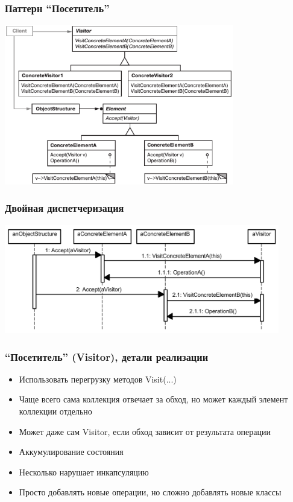 \documentclass[xetex,mathserif,serif]{beamer}
\begin{document}
    \begin{frame}
        \frametitle{Паттерн ``Посетитель''}
        \begin{center}
            \includegraphics[width=0.75\textwidth]{visitor.png}
        \end{center}
    \end{frame}

    \begin{frame}
        \frametitle{Двойная диспетчеризация}
        \begin{center}
            \includegraphics[width=0.9\textwidth]{doubleDispatching.png}
        \end{center}
    \end{frame}

    \begin{frame}
        \frametitle{``Посетитель'' (Visitor), детали реализации}
        \begin{itemize}
            \item Использовать перегрузку методов Visit(...)
            \item Чаще всего сама коллекция отвечает за обход, но может каждый элемент коллекции отдельно
            \item Может даже сам Visitor, если обход зависит от результата операции
            \item Аккумулирование состояния
            \item Несколько нарушает инкапсуляцию
            \item Просто добавлять новые операции, но сложно добавлять новые классы
        \end{itemize}
    \end{frame}
\end{document}
